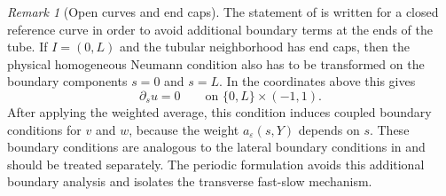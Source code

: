 \documentclass[11pt]{article}
\theoremstyle{definition}
\theoremstyle{remark}
\newtheorem{remark}[theorem]{Remark}
\numberwithin{equation}{section}
\newcommand{\eps}{\varepsilon}
\newcommand{\R}{\mathbb{R}}
\begin{document}
\begin{remark}[Open curves and end caps]
The statement of  is written for a closed reference curve
in order to avoid additional boundary terms at the ends of the tube. If
\(I=(0,L)\) and the tubular neighborhood has end caps, then the physical
homogeneous Neumann condition also has to be transformed on the boundary
components \(s=0\) and \(s=L\). In the coordinates above this gives
\[
\partial_su=0\qquad\text{on }\{0,L\}\times(-1,1).
\]
After applying the weighted average, this condition induces coupled boundary
conditions for \(v\) and \(w\), because the weight \(a_\varepsilon(s,Y)\)
depends on \(s\). These boundary conditions are analogous to the lateral
boundary conditions in  and should be treated
separately. The periodic formulation avoids this additional boundary
analysis and isolates the transverse fast-slow mechanism.
\begin{figure}[ht]
\centering
{}
\end{figure}
\end{remark}
\end{document}
